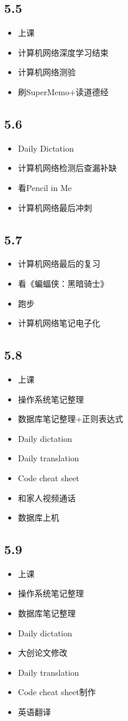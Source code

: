 \documentclass[UTF8]{ctexart}
\begin{document}
\subsection*{5.5}
\begin{itemize}
    \item 上课
    \item 计算机网络深度学习结束
    \item 计算机网络测验
    \item 刷SuperMemo+读道德经
\end{itemize}
\subsection*{5.6}
\begin{itemize}
    \item Daily Dictation
    \item 计算机网络检测后查漏补缺
    \item 看Pencil in Me
    \item 计算机网络最后冲刺
\end{itemize}
\subsection*{5.7}
\begin{itemize}
    \item 计算机网络最后的复习
    \item 看《蝙蝠侠：黑暗骑士》
    \item 跑步
    \item 计算机网络笔记电子化
\end{itemize}
\subsection*{5.8}
\begin{itemize}
    \item 上课
    \item 操作系统笔记整理
    \item 数据库笔记整理+正则表达式
    \item Daily dictation
    \item Daily translation
    \item Code cheat sheet
    \item 和家人视频通话
    \item 数据库上机
\end{itemize}
\subsection*{5.9}
\begin{itemize}
    \item 上课
    \item 操作系统笔记整理
    \item 数据库笔记整理
    \item Daily dictation
    \item 大创论文修改
    \item Daily translation
    \item Code cheat sheet制作
    \item 英语翻译
\end{itemize}
\end{document}
